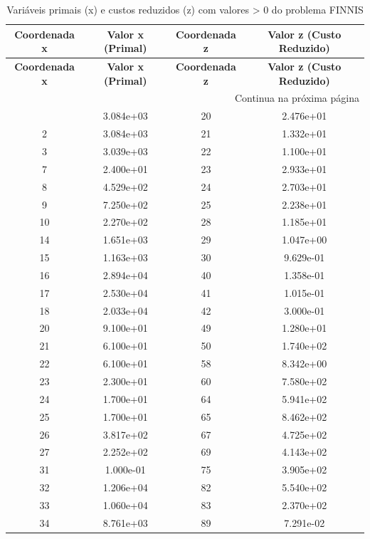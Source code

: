 \documentclass[12pt]{article}
\begin{document}
\begin{longtable}{@{}cccc@{}}
\caption{Variáveis primais (x) e custos reduzidos (z) com valores > 0 do problema FINNIS} \\
\toprule
\textbf{Coordenada x} & \textbf{Valor x (Primal)} & \textbf{Coordenada z} & \textbf{Valor z (Custo Reduzido)} \\
\midrule
\endfirsthead

\toprule
\textbf{Coordenada x} & \textbf{Valor x (Primal)} & \textbf{Coordenada z} & \textbf{Valor z (Custo Reduzido)} \\
\midrule
\endhead

\midrule \multicolumn{4}{r}{{Continua na próxima página}} \\ \midrule
\endfoot

\bottomrule
\endlastfoot
1 & 3.084e+03 & 20 & 2.476e+01 \\
2 & 3.084e+03 & 21 & 1.332e+01 \\
3 & 3.039e+03 & 22 & 1.100e+01 \\
7 & 2.400e+01 & 23 & 2.933e+01 \\
8 & 4.529e+02 & 24 & 2.703e+01 \\
9 & 7.250e+02 & 25 & 2.238e+01 \\
10 & 2.270e+02 & 28 & 1.185e+01 \\
14 & 1.651e+03 & 29 & 1.047e+00 \\
15 & 1.163e+03 & 30 & 9.629e-01 \\
16 & 2.894e+04 & 40 & 1.358e-01 \\
17 & 2.530e+04 & 41 & 1.015e-01 \\
18 & 2.033e+04 & 42 & 3.000e-01 \\
20 & 9.100e+01 & 49 & 1.280e+01 \\
21 & 6.100e+01 & 50 & 1.740e+02 \\
22 & 6.100e+01 & 58 & 8.342e+00 \\
23 & 2.300e+01 & 60 & 7.580e+02 \\
24 & 1.700e+01 & 64 & 5.941e+02 \\
25 & 1.700e+01 & 65 & 8.462e+02 \\
26 & 3.817e+02 & 67 & 4.725e+02 \\
27 & 2.252e+02 & 69 & 4.143e+02 \\
31 & 1.000e-01 & 75 & 3.905e+02 \\
32 & 1.206e+04 & 82 & 5.540e+02 \\
33 & 1.060e+04 & 83 & 2.370e+02 \\
34 & 8.761e+03 & 89 & 7.291e-02 \\

\end{longtable}
\end{document}
